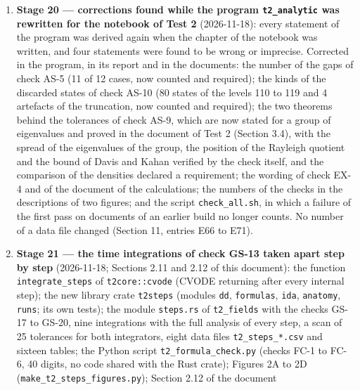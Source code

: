 \documentclass[
  10pt,
]{article}
\begin{document}
\begin{enumerate}
  \(B^{\rm err}_{\rm LL}\) extended to IDA (with the new symbol
  \(h^{\rm IDA}_{\rm LL}\)), one new entry (\(B^{\rm loc}_{\rm LL}\),
  \(\delta^{\rm loc}_{\rm LL}\), \(E^{\rm max}_{\rm LL}\),
  \(r^{\rm der}_{\rm LL}\), \(B^{\rm out}_{\rm LL}\)), the meaning of
  \(B^{\rm H}_{\rm LL}\) corrected; Sections 2.10, 3, 4, 6 and 7 of this
  document completed (Section 11, entry E65).
\item
  \textbf{Stage 20 --- corrections found while the program
  \texttt{t2\_analytic} was rewritten for the notebook of Test 2}
  (2026-11-18): every statement of the program was derived again when
  the chapter of the notebook was written, and four statements were
  found to be wrong or imprecise. Corrected in the program, in its
  report and in the documents: the number of the gaps of check AS-5 (11
  of 12 cases, now counted and required); the kinds of the discarded
  states of check AS-10 (80 states of the levels 110 to 119 and 4
  artefacts of the truncation, now counted and required); the two
  theorems behind the tolerances of check AS-9, which are now stated for
  a group of eigenvalues and proved in the document of Test 2 (Section
  3.4), with the spread of the eigenvalues of the group, the position of
  the Rayleigh quotient and the bound of Davis and Kahan verified by the
  check itself, and the comparison of the densities declared a
  requirement; the wording of check EX-4 and of the document of the
  calculations; the numbers of the checks in the descriptions of two
  figures; and the script \texttt{check\_all.sh}, in which a failure of
  the first pass on documents of an earlier build no longer counts. No
  number of a data file changed (Section 11, entries E66 to E71).
\item
  \textbf{Stage 21 --- the time integrations of check GS-13 taken apart
  step by step} (2026-11-18; Sections 2.11 and 2.12 of this document):
  the function \texttt{integrate\_steps} of \texttt{t2core::cvode}
  (CVODE returning after every internal step); the new library crate
  \texttt{t2steps} (modules \texttt{dd}, \texttt{formulas},
  \texttt{ida}, \texttt{anatomy}, \texttt{runs}; its own tests); the
  module \texttt{steps.rs} of \texttt{t2\_fields} with the checks GS-17
  to GS-20, nine integrations with the full analysis of every step, a
  scan of 25 tolerances for both integrators, eight data files
  \texttt{t2\_steps\_*.csv} and sixteen tables; the Python script
  \texttt{t2\_formula\_check.py} (checks FC-1 to FC-6, 40 digits, no
  code shared with the Rust crate); Figures 2A to 2D
  (\texttt{make\_t2\_steps\_figures.py}); Section 2.12 of the document

\end{enumerate}
\end{document}

